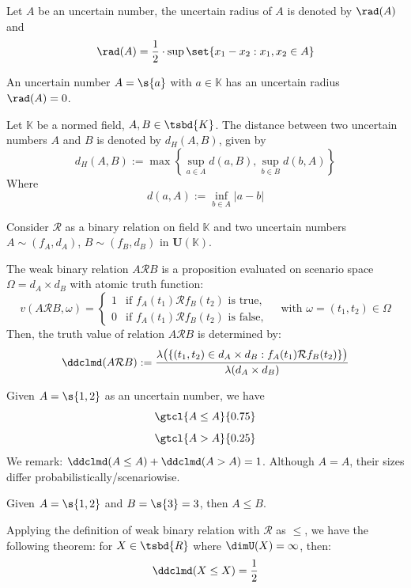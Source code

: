 \begin{definition}
	Let $A$ be an uncertain number, the uncertain radius of $A$ is denoted by $\rad(A)$ and $$\rad(A) = \frac{1}{2} \cdot \sup \set{x_1 - x_2 : x_1, x_2 \in A}$$
\end{definition}
\begin{corollary}
	An uncertain number $A = \s{a}$ with $a \in \mathbb{K}$ has an uncertain radius $\rad(A) = 0$.
\end{corollary}
\begin{definition}[Distance]
	Let $\mathbb{K}$ be a normed field, $A, B \in \tsbd{K}$. The distance between two uncertain numbers $A$ and $B$ is denoted by $d_H(A,B)$, given by
	$$
	d_H(A,B) := \max\left\{\sup_{a \in A}{d(a,B),\sup_{b \in B}{d(b,A)}}\right\}
	$$ Where
	$$d(a,A) := \inf_{b\in A}{|a-b|}$$
\end{definition}
\begin{definition}
	Consider $\mathcal{R}$ as a binary relation on field $\mathbb{K}$ and two uncertain numbers $A \sim (f_A, d_A)$, $B \sim (f_B, d_B)$ in $\mathbf{U}(\mathbb{K})$. 
	
	The weak binary relation $A \mathcal{R} B$ is a proposition evaluated on scenario space $\Omega = d_A \times d_B$ with atomic truth function:
	\[
	v(A \mathcal{R} B, \omega) = \begin{cases} 
		1 & \text{if } f_A(t_1) \mathcal{R} f_B(t_2) \text{ is true}, \\
		0 & \text{if } f_A(t_1) \mathcal{R} f_B(t_2) \text{ is false},
	\end{cases} \quad \text{with } \omega = (t_1, t_2) \in \Omega
	\]
	Then, the truth value of relation $A \mathcal{R} B$ is determined by:
	\[
	\ddclmd(A \mathcal{R} B) := \frac{\lambda\big(\{(t_1, t_2) \in d_A \times d_B : f_A(t_1) \mathcal{R} f_B(t_2)\}\big)}{\lambda(d_A \times d_B)}
	\]
\end{definition}
\begin{example}
	Given $A = \s{1,2}$ as an uncertain number, we have $$\gtcl{A\leq A}{0.75}$$ $$\gtcl{A>A}{0.25}$$
	We remark: $\ddclmd(A\leq A) + \ddclmd(A>A) = 1$. Although $A=A$, their sizes differ probabilistically/scenariowise.
\end{example}
\begin{example}
	Given $A = \s{1,2}$ and $B = \s{3} = 3$, then $A \leq B$.
\end{example}
\begin{theorem}[Balance]
	Applying the definition of weak binary relation with $\mathcal{R}$ as $\leq$, we have the following theorem:
	for $X \in \tsbd{R}$ where $\dimU(X) = \infty$, then: 
	$$\ddclmd(X\leq X) = \frac{1}{2}$$
\end{theorem}
